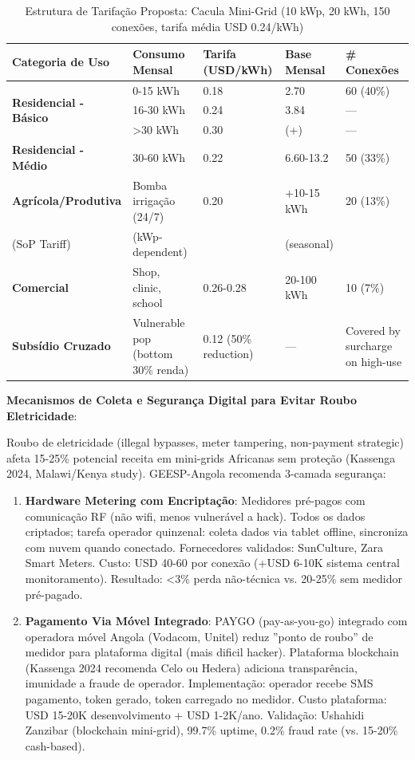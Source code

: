 \documentclass[12pt, a4paper]{article}
\begin{document}
{{{{{{{{{{{{\begin{table}[H]
\centering
\caption{Estrutura de Tarifação Proposta: Cacula Mini-Grid (10 kWp, 20 kWh, 150 conexões, tarifa média USD 0.24/kWh)}
\label{tab:tariff_structure}
\small
\begin{tabular}{|l|l|l|l|l|}
\hline
\textbf{Categoria de Uso} & \textbf{Consumo Mensal} & \textbf{Tarifa (USD/kWh)} & \textbf{Base Mensal} & \textbf{\# Conexões} \\
\hline
\multirow{3}{*}{\textbf{Residencial - Básico}} & 0-15 kWh & 0.18 & 2.70 & 60 (40\%) \\
& 16-30 kWh & 0.24 & 3.84 & — \\
& >30 kWh & 0.30 & (+) & — \\
\hline
\textbf{Residencial - Médio} & 30-60 kWh & 0.22 & 6.60-13.2 & 50 (33\%) \\
\hline
\textbf{Agrícola/Produtiva} & Bomba irrigação (24/7) & 0.20 & +10-15 kWh & 20 (13\%) \\
(SoP Tariff) & (kWp-dependent) & & (seasonal) & \\
\hline
\textbf{Comercial} & Shop, clinic, school & 0.26-0.28 & 20-100 kWh & 10 (7\%) \\
\hline
\textbf{Subsídio Cruzado} & Vulnerable pop (bottom 30\% renda) & 0.12 (50\% reduction) & — & Covered by surcharge on high-use \\
\hline
\end{tabular}
\end{table}

\textbf{Mecanismos de Coleta e Segurança Digital para Evitar Roubo Eletricidade}:

Roubo de eletricidade (illegal bypasses, meter tampering, non-payment strategic) afeta 15-25\% potencial receita em mini-grids Africanas sem proteção (Kassenga 2024, Malawi/Kenya study). GEESP-Angola recomenda 3-camada segurança:

\begin{enumerate}
\item \textbf{Hardware Metering com Encriptação}: Medidores pré-pagos com comunicação RF (não wifi, menos vulnerável a hack). Todos os dados criptados; tarefa operador quinzenal: coleta dados via tablet offline, sincroniza com nuvem quando conectado. Fornecedores validados: SunCulture, Zara Smart Meters. Custo: USD 40-60 por conexão (+USD 6-10K sistema central monitoramento). Resultado: <3\% perda não-técnica vs. 20-25\% sem medidor pré-pagado.

\item \textbf{Pagamento Via Móvel Integrado}: PAYGO (pay-as-you-go) integrado com operadora móvel Angola (Vodacom, Unitel) reduz ''ponto de roubo'' de medidor para plataforma digital (mais dificil hacker). Plataforma blockchain (Kassenga 2024 recomenda Celo ou Hedera) adiciona transparência, imunidade a fraude de operador. Implementação: operador recebe SMS pagamento, token gerado, token carregado no medidor. Custo plataforma: USD 15-20K desenvolvimento + USD 1-2K/ano. Validação: Ushahidi Zanzibar (blockchain mini-grid), 99.7\% uptime, 0.2\% fraud rate (vs. 15-20\% cash-based).


\end{enumerate}}}}}}}}}}}}}
\end{document}
